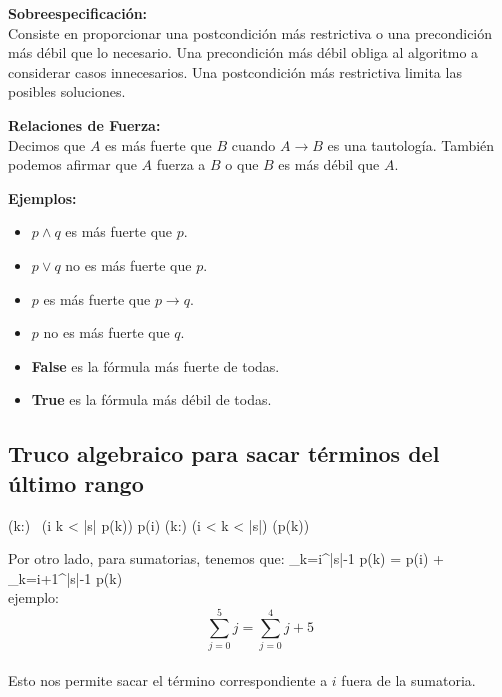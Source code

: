 \documentclass[9pt]{extarticle}  %
\begin{document}
\noindent\textbf{Sobreespecificación:} \\
Consiste en proporcionar una postcondición más restrictiva o una precondición más débil que lo necesario. Una precondición más débil obliga al algoritmo a considerar casos innecesarios. Una postcondición más restrictiva limita las posibles soluciones.

\noindent\textbf{Relaciones de Fuerza:} \\
Decimos que \(A\) es más fuerte que \(B\) cuando \(A \rightarrow B\) es una tautología. También podemos afirmar que \(A\) fuerza a \(B\) o que \(B\) es más débil que \(A\).

\noindent\textbf{Ejemplos:}
\begin{itemize}
\vspace{-0.3cm}
    \item \(p \land q\) es más fuerte que \(p\).
    \vspace{-0.3cm}
    \item \(p \lor q\) no es más fuerte que \(p\).
\vspace{-0.3cm}
    \item \(p\) es más fuerte que \(p \rightarrow q\).
    \vspace{-0.3cm}
    \item \(p\) no es más fuerte que \(q\).
    \vspace{-0.3cm}
    \item \textbf{False} es la fórmula más fuerte de todas.
    \vspace{-0.3cm}
    \item \textbf{True} es la fórmula más débil de todas.
    \vspace{-0.3cm}
\end{itemize}
\subsection*{\tiny {Truco algebraico para sacar términos del último rango}}
    \vspace{-0.2cm}
(\forall k:\ent) \, (i \leq k < |s| \implicaLuego p(k)) \equiv p(i) \wedge (\forall k:\ent ) (i < k < |s|) \implicaLuego (p(k))

Por otro lado, para sumatorias, tenemos que:
\sum_{k=i}^{|s|-1} p(k) = p(i) + \sum_{k=i+1}^{|s|-1} p(k)
\\ ejemplo:
\[ \sum_{j=0}^{5} j = \sum_{j=0}^{4} j + 5 \] \\
Esto nos permite sacar el término correspondiente a \( i \) fuera de la sumatoria.
\end{document}
